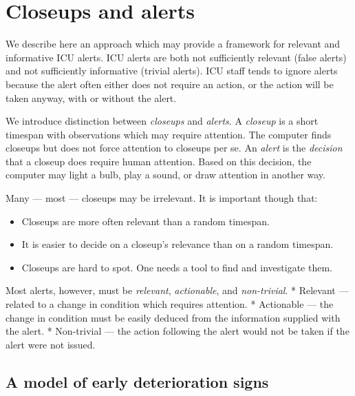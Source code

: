 \section{Closeups and alerts}\label{closeups-and-alerts}

We describe here an approach which may provide a framework for relevant
and informative ICU alerts. ICU alerts are both not sufficiently
relevant (false alerts) and not sufficiently informative (trivial
alerts). ICU staff tends to ignore alerts because the alert often either
does not require an action, or the action will be taken anyway, with or
without the alert.

We introduce distinction between \emph{closeups} and \emph{alerts}. A
\emph{closeup} is a short timespan with observations which may require
attention. The computer finds closeups but does not force attention to
closeups per se. An \emph{alert} is the \emph{decision} that a closeup
does require human attention. Based on this decision, the computer may
light a bulb, play a sound, or draw attention in another way.

Many --- most --- closeups may be irrelevant. It is important though
that:

\begin{itemize}
\tightlist
\item
  Closeups are more often relevant than a random timespan.
\item
  It is easier to decide on a closeup's relevance than on a random
  timespan.
\item
  Closeups are hard to spot. One needs a tool to find and investigate
  them.
\end{itemize}

Most alerts, however, must be \emph{relevant}, \emph{actionable}, and
\emph{non-trivial}. * Relevant --- related to a change in condition
which requires attention. * Actionable --- the change in condition must
be easily deduced from the information supplied with the alert. *
Non-trivial --- the action following the alert would not be taken if the
alert were not issued.

\subsection{A model of early deterioration
signs}\label{a-model-of-early-deterioration-signs}

